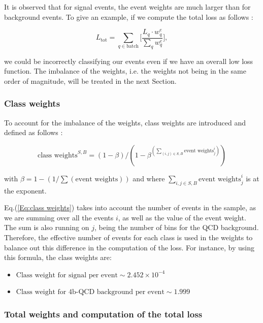 It is observed that for signal events, the event weights are much larger than for background events. To give an example, if we compute the total loss as follows :

\begin{equation}
    L_{\text{tot}}= \sum_{q \in \text{batch}} \bigg[\frac{L_q \cdot w^e_q}{\sum_q w^e_q} \bigg] ,
\label{Eq: loss event weights}
\end{equation}

\noindent we could be incorrectly classifying our events even if we have an overall low loss function. The imbalance of the weights, i.e. the weights not being in the same order of magnitude, will be treated in the next Section.


\subsubsection{Class weights}

To account for the imbalance of the weights, class weights are introduced and defined as follows \cite{classbalance}:

\begin{equation}
    \text{class weights}^{S,B} = (1- \beta)/ (1- \beta^{(\sum_{(i,j)\in S,B}\text{event weights}^i_j)})
    \label{Eq:class weights}
\end{equation}

\noindent with $\beta= 1 - (1/\sum (\text{event weights}))$ and where $\sum_{i,j\in S,B}\text{event weights}^i_j$ is at the exponent.

\vspace{0.1cm}

Eq.(\ref{Eq:class weights}) takes into account the number of events in the sample, as we are summing over all the events $i$, as well as the value of the event weight. The sum is also running on $j$, being the number of \Ht bins for the QCD background. Therefore, the effective number of events for each class is used in the weights to balance out this difference in the computation of the loss. For instance, by using this formula, the class weights are:
\begin{itemize}
    \item $\text{Class weight for signal per event} \sim 2.452 \times 10^{-4}$
    \item $\text{Class weight for 4b-QCD background per event} \sim 1.999$
\end{itemize}


\subsubsection{Total weights and computation of the total loss}


